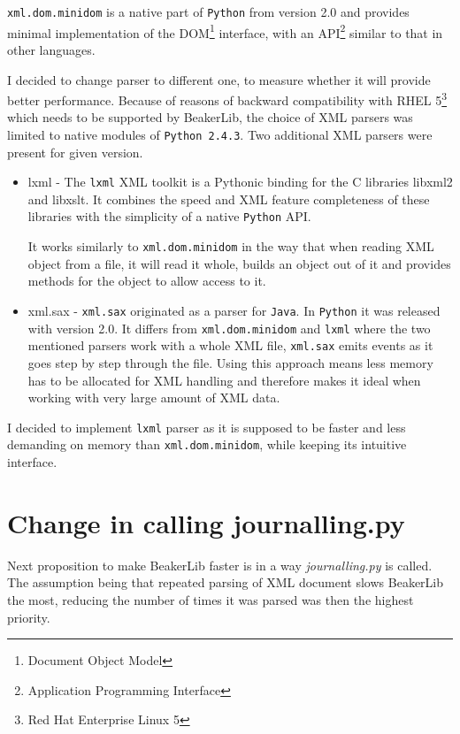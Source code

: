  \texttt{xml.dom.minidom} is a native part of \texttt{Python} from version 2.0 and provides minimal implementation of the DOM\footnote{Document Object Model} interface, with an API\footnote{Application Programming Interface} similar to that in other languages. 

I decided to change parser to different one, to measure whether it will provide better performance. Because of reasons of backward compatibility with RHEL 5\footnote{Red Hat Enterprise Linux 5} which needs to be supported by BeakerLib, the choice of XML parsers was limited to native modules of \texttt{Python 2.4.3}. Two additional XML parsers were present for given version.

\begin{itemize}
\item lxml - The \texttt{lxml} XML toolkit is a Pythonic binding for the C libraries libxml2 and libxslt. It combines the speed and XML feature completeness of these libraries with the simplicity of a native \texttt{Python} API.  \cite{lxml_doc}

It works similarly to \texttt{xml.dom.minidom} in the way that when reading XML object from a file, it will read it whole, builds an object out of it and provides methods for the object to allow access to it.
\item xml.sax  \cite{sax_doc} - \texttt{xml.sax} originated as a parser for \texttt{Java}\cite{Sax2}. In \texttt{Python} it was released with version 2.0. It differs from \texttt{xml.dom.minidom} and \texttt{lxml} where the two mentioned parsers work with a whole XML file,  \texttt{xml.sax} emits events as it goes step by step through the file\cite{sax_example}. Using this approach means less memory has to be allocated for XML handling and therefore makes it ideal when working with very large amount of XML  data.
\end{itemize}

I decided to implement \texttt{lxml} parser as it is supposed to be faster and less demanding on memory than \texttt{xml.dom.minidom}\cite{lxml_performance}, while keeping its intuitive interface.

\section{Change in calling journalling.py}
Next proposition to make BeakerLib faster is in a way \textit{journalling.py} is called. The assumption being that repeated parsing of XML document slows BeakerLib the most, reducing the number of times it was parsed was then the highest priority. 

